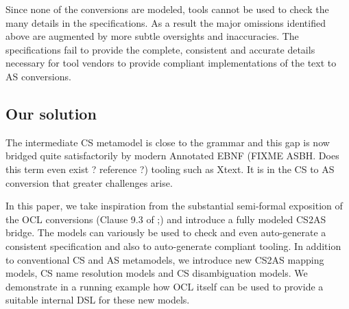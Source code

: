 \documentclass{llncs}
\begin{document}
Since none of the conversions are modeled, tools cannot be used to check the many details in the specifications. As a result the major omissions identified above are augmented by more subtle oversights and inaccuracies. The specifications fail to provide the complete, consistent and accurate details necessary for tool vendors to provide compliant implementations of the text to AS conversions. 


\subsection{Our solution}

The intermediate CS metamodel is close to the grammar and this gap is now bridged quite satisfactorily by modern Annotated EBNF (FIXME ASBH. Does this term even exist ? reference ?) tooling such as Xtext. It is in the CS to AS conversion that greater challenges arise. 

In this paper, we take inspiration from the substantial semi-formal exposition of the OCL conversions (Clause 9.3 of \cite{omg2013ocl};) and introduce a fully modeled CS2AS bridge. The models can variously be used to check and even auto-generate a consistent specification and also to auto-generate compliant tooling. In addition to conventional CS and AS metamodels, we introduce new CS2AS mapping models, CS name resolution models and CS disambiguation models. We demonstrate in a running example how OCL itself can be used to provide a suitable internal DSL for these new models.


\end{document}
